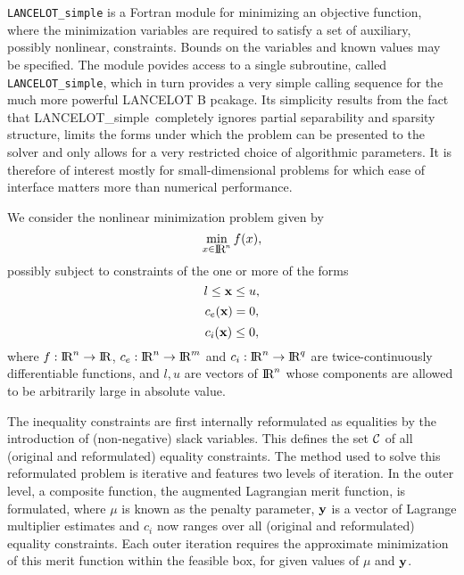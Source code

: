 \documentclass{galahad}
\newcommand{\packagename}{LANCELOT\_simple}
\newcommand{\calC}{{\cal C}}
\renewcommand{\Re}{\hbox{I\hskip -1.5pt R}}
\begin{document}
\galheader


\galsummary

{\tt \packagename} is a Fortran module for minimizing an objective function,
where the minimization variables are required to satisfy a set of auxiliary,
possibly nonlinear, constraints.  Bounds on the variables and known values may
be specified.  The module povides access to a single subroutine, called {\tt
LANCELOT\_simple}, which in turn provides a very simple calling sequence for
the much more powerful LANCELOT B pcakage.  Its simplicity results from the
fact that \packagename\ completely ignores partial separability and sparsity
structure, limits the forms under which the problem can be presented to the
solver and only allows for a very restricted choice of algorithmic parameters.
It is therefore of interest mostly for small-dimensional problems for which
ease of interface matters more than numerical performance.

\galbasics

We consider the nonlinear minimization problem given by
\[
\min_{x \in \smallRe^n} f( x ),
\]
possibly subject to constraints of the one or more of the forms
\[
l \leq  {\mathbf{x}} \leq u,
\]
\[
c_e( {\mathbf{x}} )  = 0,
\]
\[
c_i( {\mathbf{x}} ) \leq 0,
\]
where $f: \Re^n \rightarrow \Re$, $c_e: \Re^n \rightarrow \Re^{m}$ and
$c_i: \Re^n \rightarrow \Re^{q}$ are twice-continuously differentiable
functions, and $l, u$ are vectors of $\Re^n$ whose components are allowed
to be arbitrarily large in absolute value.

The inequality constraints are first internally reformulated as equalities by
the introduction of (non-negative) slack variables. This defines the set
$\calC$ of all (original and reformulated) equality constraints. The method
used to solve this reformulated problem is iterative and features two levels of
iteration. In the outer level, a composite function, the augmented Lagrangian
merit function,
\eqn{objectiveb}{
\phi( \bmx, \bmy, \mu ) = f(\bmx) + \sum_{i \in \calC}
 y_i c_i (\bmx) + \frac{1}{2 \mu} \sum_{i\in \calC} [c_i (\bmx)]^2,
}
is formulated, where $\mu$ is known as the penalty parameter,  ${\mathbf{y}}$ is a
vector of Lagrange multiplier estimates and $c_i$ now ranges over all
(original and reformulated) equality constraints.  Each outer iteration
requires the approximate minimization of this merit function
within the feasible box, for given values of $\mu$ and ${\mathbf{y}}$.
\end{document}
